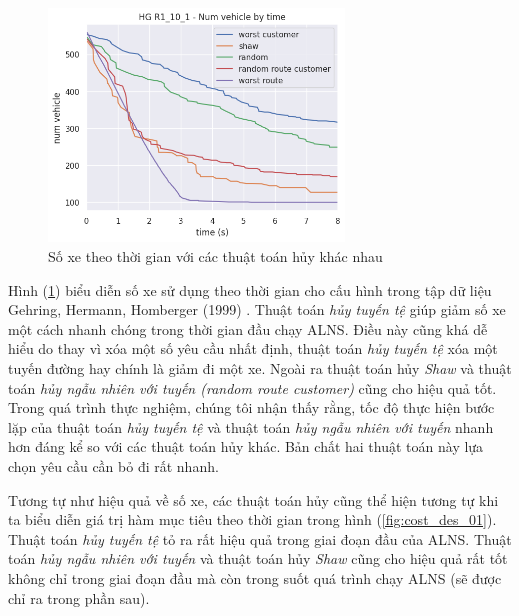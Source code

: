 \begin{figure}[H] %
	\centering %
	\includegraphics[width=0.7\textwidth]{figures/nv_time_des_10s_R1_10_1.png}
	\caption{Số xe theo thời gian với các thuật toán hủy khác nhau}
	\label{fig:nv_des_01}
\end{figure}

Hình (\ref{fig:nv_des_01}) biểu diễn số xe sử dụng theo thời gian cho cấu hình  trong tập dữ liệu Gehring, Hermann, Homberger (1999) \cite{gehring1999parallel}. Thuật toán \textit{hủy tuyến tệ} giúp giảm số xe một cách nhanh chóng trong thời gian đầu chạy ALNS. Điều này cũng khá dễ hiểu do thay vì xóa một số yêu cầu nhất định, thuật toán \textit{hủy tuyến tệ} xóa một tuyến đường hay chính là giảm đi một xe. Ngoài ra thuật toán hủy \textit{Shaw} và thuật toán \textit{hủy ngẫu nhiên với tuyến (random route customer)} cũng cho hiệu quả tốt. Trong quá trình thực nghiệm, chúng tôi nhận thấy rằng, tốc độ thực hiện bước lặp của thuật toán \textit{hủy tuyến tệ} và thuật toán \textit{hủy ngẫu nhiên với tuyến} nhanh hơn đáng kể so với các thuật toán hủy khác. Bản chất hai thuật toán này lựa chọn yêu cầu cần bỏ đi rất nhanh.

Tương tự như hiệu quả về số xe, các thuật toán hủy cũng thể hiện tương tự khi ta biểu diễn giá trị hàm mục tiêu theo thời gian trong hình (\ref{fig:cost_des_01}). Thuật toán \textit{hủy tuyến tệ} tỏ ra rất hiệu quả trong giai đoạn đầu của ALNS. Thuật toán \textit{hủy ngẫu nhiên với tuyến} và thuật toán hủy \textit{Shaw} cũng cho hiệu quả rất tốt không chỉ trong giai đoạn đầu mà còn trong suốt quá trình chạy ALNS (sẽ được chỉ ra trong phần sau).

